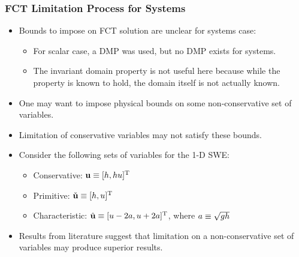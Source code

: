 \begin{frame}
\frametitle{FCT Limitation Process for Systems}

\begin{itemize}
  \item Bounds to impose on FCT solution are unclear for systems case:
    \begin{itemize}
      \item For scalar case, a DMP was used, but no DMP exists for systems.
      \item The invariant domain property is not useful here
        because while the property is known to hold, the domain itself is not
        actually known.
    \end{itemize}
  \item One may want to impose physical bounds on some non-conservative
    set of variables.
  \item Limitation of conservative variables may not satisfy these bounds.
  \item Consider the following sets of variables for the 1-D SWE:
    \begin{itemize}
      \item \textcolor{secondarycolorheavy}{Conservative}:
        $\mathbf{u} \equiv [h,hu]^{\text{T}}$
      \item \textcolor{secondarycolorheavy}{Primitive}:
        $\check{\mathbf{u}} \equiv [h,u]^{\text{T}}$
      \item \textcolor{secondarycolorheavy}{Characteristic}:
        $\hat{\mathbf{u}} \equiv [u-2a,
          u+2a]^{\text{T}}$,
          where $a\equiv\sqrt{gh}$
    \end{itemize}
  \item Results from literature suggest that limitation on a non-conservative
    set of variables may produce superior results.
\end{itemize}

\end{frame}
